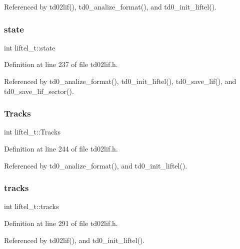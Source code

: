 Referenced by td02lif(), td0\+\_\+analize\+\_\+format(), and td0\+\_\+init\+\_\+liftel().

\mbox{\label{structliftel__t_a579b9a2411fc6cf4bcdd4cac15d48e49}} 
\subsubsection{\texorpdfstring{state}{state}}
{\footnotesize\ttfamily int liftel\+\_\+t\+::state}



Definition at line 237 of file td02lif.\+h.



Referenced by td0\+\_\+analize\+\_\+format(), td0\+\_\+init\+\_\+liftel(), td0\+\_\+save\+\_\+lif(), and td0\+\_\+save\+\_\+lif\+\_\+sector().

\mbox{\label{structliftel__t_a1c433cb2546f09c4093f0e98d61212b2}} 
\subsubsection{\texorpdfstring{Tracks}{Tracks}}
{\footnotesize\ttfamily int liftel\+\_\+t\+::\+Tracks}



Definition at line 244 of file td02lif.\+h.



Referenced by td0\+\_\+analize\+\_\+format(), and td0\+\_\+init\+\_\+liftel().

\mbox{\label{structliftel__t_a24244c0ee111d3f46eedd7578eb1acf7}} 
\subsubsection{\texorpdfstring{tracks}{tracks}}
{\footnotesize\ttfamily int liftel\+\_\+t\+::tracks}



Definition at line 291 of file td02lif.\+h.



Referenced by td02lif(), and td0\+\_\+init\+\_\+liftel().

